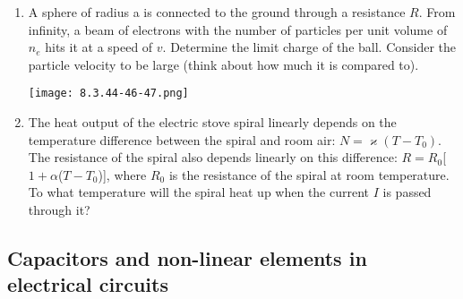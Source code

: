\documentclass{article}
\begin{document}
\begin{enumerate}[label=8.3.\arabic*]
\item A sphere of radius a is connected to the ground through a resistance $R$. From infinity, a beam of electrons with the number of particles per unit volume of $n_e$ hits it at a speed of $v$. Determine the limit charge of the ball. Consider the particle velocity to be large (think about how much it is compared to).

\begin{center}
    \texttt{[image: 8.3.44-46-47.png]}
\end{center}


\item The heat output of the electric stove spiral linearly depends on the temperature difference between the spiral and room air: $N = \varkappa (T - T_0)$. The resistance of the spiral also depends linearly on this difference: $R = R_0$[$1 + \alpha $($T - T_0$)], where $R_0$ is the resistance of the spiral at room temperature. To what temperature will the spiral heat up when the current $I$ is passed through it?


\end{enumerate}
\subsection{Capacitors and non-linear elements in electrical circuits}
\end{document}
